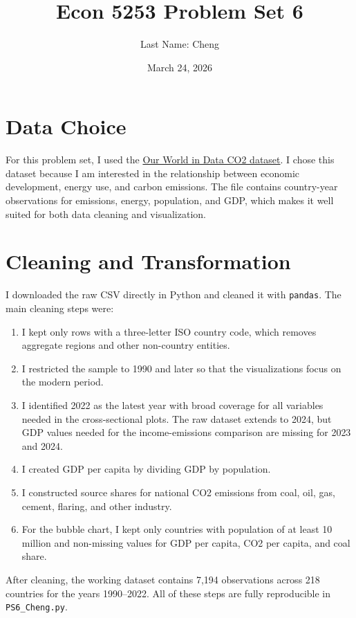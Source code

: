 \documentclass[11pt]{article}
\title{Econ 5253 Problem Set 6}
\author{Last Name: Cheng}
\date{March 24, 2026}
\begin{document}
\maketitle

\section*{Data Choice}
For this problem set, I used the
\href{https://raw.githubusercontent.com/owid/co2-data/master/owid-co2-data.csv}{Our World in Data CO2 dataset}.
I chose this dataset because I am interested in the relationship between economic development, energy use, and carbon emissions.
The file contains country-year observations for emissions, energy, population, and GDP, which makes it well suited for both data cleaning and visualization.

\section*{Cleaning and Transformation}
I downloaded the raw CSV directly in Python and cleaned it with \texttt{pandas}.
The main cleaning steps were:
\begin{enumerate}
\item I kept only rows with a three-letter ISO country code, which removes aggregate regions and other non-country entities.
\item I restricted the sample to 1990 and later so that the visualizations focus on the modern period.
\item I identified 2022 as the latest year with broad coverage for all variables needed in the cross-sectional plots. The raw dataset extends to 2024, but GDP values needed for the income-emissions comparison are missing for 2023 and 2024.
\item I created GDP per capita by dividing GDP by population.
\item I constructed source shares for national CO2 emissions from coal, oil, gas, cement, flaring, and other industry.
\item For the bubble chart, I kept only countries with population of at least 10 million and non-missing values for GDP per capita, CO2 per capita, and coal share.
\end{enumerate}

After cleaning, the working dataset contains 7,194 observations across 218 countries for the years 1990--2022.
All of these steps are fully reproducible in \texttt{PS6\_Cheng.py}.
\end{document}
